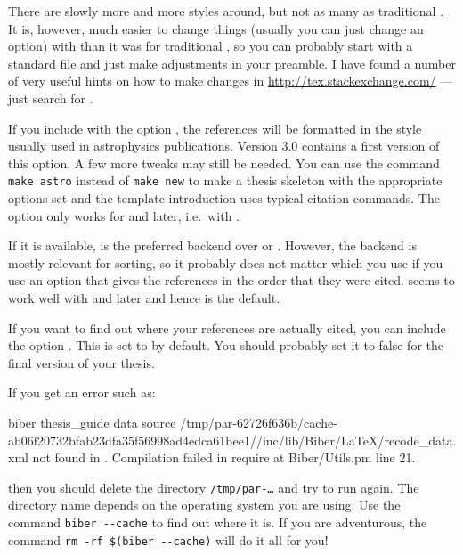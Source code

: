 There are slowly more and more  styles around, but
not as many as traditional \BibTeX. It is, however, much easier to change things
(usually you can just change an option) with  than it
was for traditional \BibTeX, so you can probably start with a standard file and
just make adjustments in your preamble. I have found a number of very
useful hints on how to make changes in
\url{http://tex.stackexchange.com/} --- just search for .

If you include  with the option ,
the references will be formatted in the style usually used in astrophysics publications.
Version 3.0 contains a first version of this option.
A few more tweaks may still be needed. You can use the command
\verb|make astro| instead of \verb|make new| to make a thesis skeleton with the appropriate
options set and the template introduction uses typical citation commands.
The option  only works for  and later, i.e.\ with .

If it is available,  is the preferred backend over
 or .
However, the backend is mostly relevant for
sorting, so it probably does not matter which you use if you use an
option that gives the references in the order that they were cited.
 seems to work well with  and later and hence is the default.

If you want to find out where your references are actually cited, you
can include the option .
This is set to  by default.
You should probably set it to false for the final version of your thesis.

If you get an error such as:
{\scriptsize
\begin{bashlisting}
biber     thesis_guide
data source /tmp/par-62726f636b/cache-ab06f20732bfab23dfa35f56998ad4edca61bee1//inc/lib/Biber/LaTeX/recode_data.xml not found in .
Compilation failed in require at Biber/Utils.pm line 21.
\end{bashlisting}
}
\noindent
then you should delete the directory \texttt{/tmp/par-\ldots} and try to
run again. The directory name depends on the operating system you are using.
Use the command \verb|biber --cache| to find out where it is.
If you are adventurous, the command \verb|rm -rf $(biber --cache)| will do it all for you!


